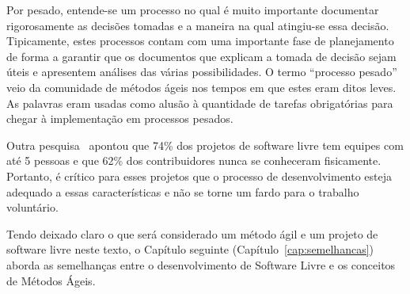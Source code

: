 Por pesado, entende-se um processo no qual é muito importante
documentar rigorosamente as decisões tomadas e a maneira na qual
atingiu-se essa decisão. Tipicamente, estes processos contam com uma
importante fase de planejamento de forma a garantir que os documentos
que explicam a tomada de decisão sejam úteis e apresentem análises das
várias possibilidades. O termo ``processo pesado'' veio da comunidade
de métodos ágeis nos tempos em que estes eram ditos leves. As palavras
eram usadas como alusão à quantidade de tarefas obrigatórias para
chegar à implementação em processos pesados.

Outra pesquisa~\cite{Reis2003} apontou que 74\% dos projetos de
software livre tem equipes com até 5 pessoas e que 62\% dos
contribuidores nunca se conheceram fisicamente. Portanto, é crítico
para esses projetos que o processo de desenvolvimento esteja adequado
a essas características e não se torne um fardo para o trabalho
voluntário.

Tendo deixado claro o que será considerado um método ágil e um projeto
de software livre neste texto, o Capítulo seguinte
(Capítulo~\ref{cap:semelhancas}) aborda as semelhanças entre o
desenvolvimento de Software Livre e os conceitos de Métodos Ágeis.
